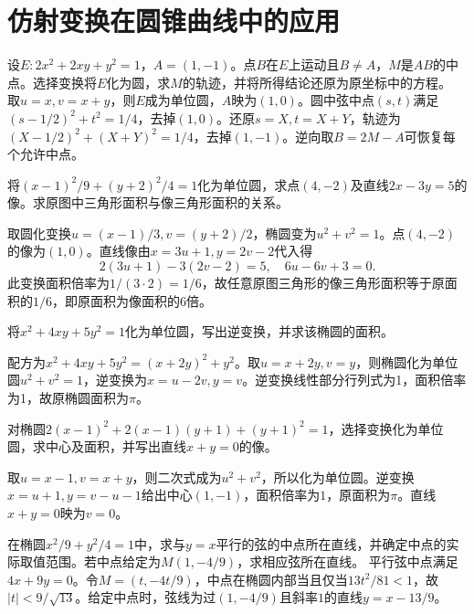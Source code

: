 \par\addvspace{12pt}

\section{仿射变换在圆锥曲线中的应用}

设\(E:2x^2+2xy+y^2=1\)，\(A=(1,-1)\)。点\(B\)在\(E\)上运动且\(B\ne A\)，\(M\)是\(AB\)的中点。选择变换将\(E\)化为圆，求\(M\)的轨迹，并将所得结论还原为原坐标中的方程。
\solutionanswer
取\(u=x,v=x+y\)，则\(E\)成为单位圆，\(A\)映为\((1,0)\)。圆中弦中点\((s,t)\)满足\((s-1/2)^2+t^2=1/4\)，去掉\((1,0)\)。还原\(s=X,t=X+Y\)，轨迹为\((X-1/2)^2+(X+Y)^2=1/4\)，去掉\((1,-1)\)。逆向取\(B=2M-A\)可恢复每个允许中点。


将\((x-1)^2/9+(y+2)^2/4=1\)化为单位圆，求点\((4,-2)\)及直线\(2x-3y=5\)的像。求原图中三角形面积与像三角形面积的关系。
\par
\solutionanswer
取圆化变换\(u=(x-1)/3,v=(y+2)/2\)，椭圆变为\(u^2+v^2=1\)。点\((4,-2)\)的像为\((1,0)\)。直线像由\(x=3u+1,y=2v-2\)代入得
\[2(3u+1)-3(2v-2)=5,\quad 6u-6v+3=0.\]
此变换面积倍率为\(1/(3\cdot2)=1/6\)，故任意原图三角形的像三角形面积等于原面积的\(1/6\)，即原面积为像面积的6倍。


将\(x^2+4xy+5y^2=1\)化为单位圆，写出逆变换，并求该椭圆的面积。
\par
\solutionanswer
配方为\(x^2+4xy+5y^2=(x+2y)^2+y^2\)。取\(u=x+2y,v=y\)，则椭圆化为单位圆\(u^2+v^2=1\)，逆变换为\(x=u-2v,y=v\)。逆变换线性部分行列式为1，面积倍率为1，故原椭圆面积为\(\pi\)。


对椭圆\(2(x-1)^2+2(x-1)(y+1)+(y+1)^2=1\)，选择变换化为单位圆，求中心及面积，并写出直线\(x+y=0\)的像。
\par
\solutionanswer
取\(u=x-1,v=x+y\)，则二次式成为\(u^2+v^2\)，所以化为单位圆。逆变换\(x=u+1,y=v-u-1\)给出中心\((1,-1)\)，面积倍率为\(1\)，原面积为\(\pi\)。直线\(x+y=0\)映为\(v=0\)。


在椭圆\(x^2/9+y^2/4=1\)中，求与\(y=x\)平行的弦的中点所在直线，并确定中点的实际取值范围。若中点给定为\(M(1,-4/9)\)，求相应弦所在直线。
\solutionanswer
平行弦中点满足\(4x+9y=0\)。令\(M=(t,-4t/9)\)，中点在椭圆内部当且仅当\(13t^2/81<1\)，故\(|t|<9/\sqrt{13}\)。给定中点时，弦线为过\((1,-4/9)\)且斜率\(1\)的直线\(y=x-13/9\)。


